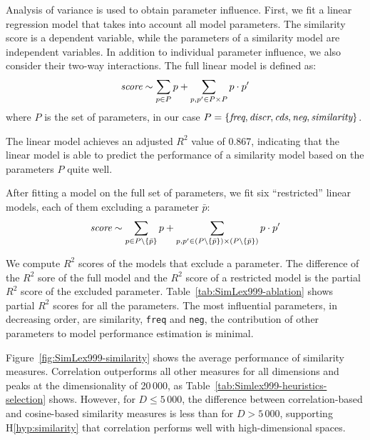 Analysis of variance is used to obtain parameter influence. First, we fit a linear regression model that takes into account all model parameters. The similarity score is a dependent variable, while the parameters of a similarity model are independent variables. In addition to individual parameter influence, we also consider their two-way interactions. The full linear model is defined as:
\begin{equation}
  \text{\it score} \sim \sum_{p \in P}p + \sum_{p, p' \in P \times P}p \cdot p'
\end{equation}
where $P$ is the set of parameters, in our case $P = \{\text{\it freq}, \text{\it discr}, \text{\it cds}, \text{\it neg}, \text{\it similarity} \}$.

The linear model achieves an adjusted $R^2$ value of 0.867, indicating that the linear model is able to predict the performance of a similarity model based on the parameters $P$ quite well.

After fitting a model on the full set of parameters,  we fit six ``restricted'' linear models, each of them excluding a parameter $\bar p$:
\begin{equation}
  \text{\it score} \sim \sum_{p \in P \setminus \{\bar p\} }p + \sum_{p, p' \in (P \setminus \{\bar p\}) \times (P \setminus \{\bar p\})}p \cdot p'
\end{equation}





We compute $R^2$ scores of the models that exclude a parameter. The difference of the $R^2$ sore of the full model and the $R^2$ score of a restricted model is the partial $R^2$ score of the excluded parameter. Table~\ref{tab:SimLex999-ablation} shows partial $R^2$ scores for all the parameters. The most influential parameters, in decreasing order, are similarity, \texttt{freq} and \texttt{neg}, the contribution of other parameters to model performance estimation is minimal.


Figure~\ref{fig:SimLex999-similarity} shows the average performance of similarity measures. Correlation outperforms all other measures for all dimensions and peaks at the dimensionality  of 20\,000, as Table~\ref{tab:Simlex999-heuristics-selection} shows. However, for $D \leq 5\,000$, the difference between correlation-based and cosine-based similarity measures is less than for $D > 5\,000$, supporting H\ref{hyp:similarity} that correlation performs well with high-dimensional spaces.

